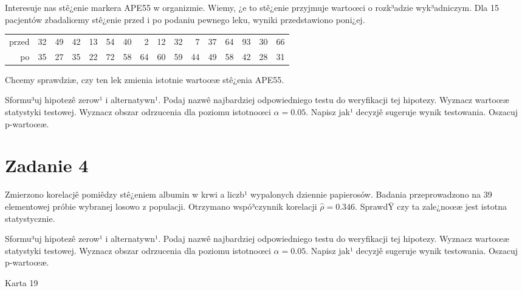 \documentclass[a4paper,12pt]{article}
\begin{document}
  Interesuje nas stê¿enie markera APE55  w organizmie. 
  Wiemy, ¿e to stê¿enie przyjmuje wartoœci o rozk³adzie wyk³adniczym. 
  Dla 15 pacjentów zbadaliœmy stê¿enie przed i po podaniu pewnego leku, 
  wyniki przedstawiono poni¿ej.
  
  \vspace{0.5cm} 
  \noindent\begin{center} 
\begin{tabular}{rrrrrrrrrrrrrrrr}
  \hline
  \hline
przed & 32 & 49 & 42 & 13 & 54 & 40 & 2 & 12 & 32 & 7 & 37 & 64 & 93 & 30 & 66 \\
  po & 35 & 27 & 35 & 22 & 72 & 58 & 64 & 60 & 59 & 44 & 49 & 58 & 42 & 28 & 31 \\
   \hline
\end{tabular}
 
  \end{center} 
  \vspace{0.5cm}
  
  Chcemy sprawdziæ, czy ten lek zmienia istotnie wartoœæ stê¿enia APE55.
  
  Sformu³uj hipotezê zerow¹ i alternatywn¹. 
  Podaj nazwê najbardziej odpowiedniego testu do weryfikacji tej hipotezy. 
  Wyznacz wartoœæ statystyki testowej. 
  Wyznacz obszar odrzucenia dla poziomu istotnoœci $\alpha=0.05$. 
  Napisz jak¹ decyzjê sugeruje wynik testowania. Oszacuj p-wartoœæ. \vspace{1cm} 

  \section*{Zadanie 4}
     
     Zmierzono korelacjê pomiêdzy stê¿eniem albumin w krwi a liczb¹ wypalonych dziennie papierosów. 
     Badania przeprowadzono na 39 elementowej próbie wybranej losowo z populacji. 
     Otrzymano wspó³czynnik korelacji $\hat\rho = 0.346 $. 
     SprawdŸ czy ta zale¿noœæ jest istotna statystycznie. 
     
     Sformu³uj hipotezê zerow¹ i alternatywn¹. 
     Podaj nazwê najbardziej odpowiedniego testu do weryfikacji tej hipotezy. 
     Wyznacz wartoœæ statystyki testowej. 
     Wyznacz obszar odrzucenia dla poziomu istotnoœci $\alpha=0.05$. 
     Napisz jak¹ decyzjê sugeruje wynik testowania. 
     Oszacuj p-wartoœæ. \vspace{1cm} 

  \clearpage  Karta  19  
\end{document}
